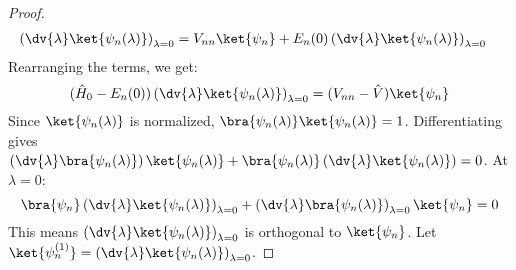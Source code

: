 \begin{proof}
\begin{align}
    \left(\dv{\lambda}\ket{\psi_n(\lambda)}\right)_{\lambda=0} &=
    V_{nn} \ket{\psi_n} + E_n(0)
    \left(\dv{\lambda}\ket{\psi_n(\lambda)}\right)_{\lambda=0}
  \end{align}
  Rearranging the terms, we get:
  \begin{equation} \label{eq:psi_deriv_equation}
    (\hat H_0 - E_n(0))
    \left(\dv{\lambda}\ket{\psi_n(\lambda)}\right)_{\lambda=0} =
    (V_{nn} - \hat V) \ket{\psi_n}
  \end{equation}
  Since $\ket{\psi_n(\lambda)}$ is normalized,
  $\bra{\psi_n(\lambda)}\ket{\psi_n(\lambda)} = 1$. Differentiating
  gives
  $\left(\dv{\lambda}\bra{\psi_n(\lambda)}\right)\ket{\psi_n(\lambda)}
  +
  \bra{\psi_n(\lambda)}\left(\dv{\lambda}\ket{\psi_n(\lambda)}\right)
  = 0$. At $\lambda=0$:
  \begin{equation} \label{eq:psi_deriv_orthogonality}
    \bra{\psi_n}
    \left(\dv{\lambda}\ket{\psi_n(\lambda)}\right)_{\lambda=0} +
    \left(\dv{\lambda}\bra{\psi_n(\lambda)}\right)_{\lambda=0}
    \ket{\psi_n} = 0
  \end{equation}
  This means
  $\left(\dv{\lambda}\ket{\psi_n(\lambda)}\right)_{\lambda=0}$ is
  orthogonal to $\ket{\psi_n}$. Let $\ket{\psi_n^{(1)}} =
  \left(\dv{\lambda}\ket{\psi_n(\lambda)}\right)_{\lambda=0}$.


\end{proof}

